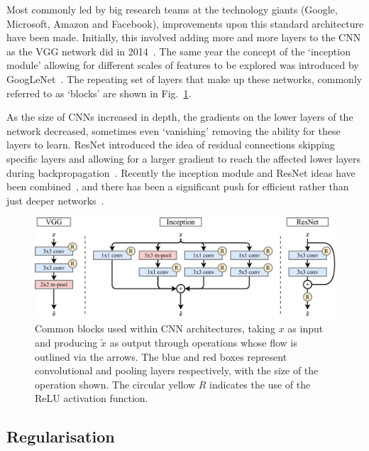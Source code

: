Most commonly led by big research teams at the technology giants (Google, Microsoft, Amazon and
Facebook), improvements upon this standard architecture have been made. Initially, this involved
adding more and more layers to the CNN as the VGG network did in 2014~\cite{simonyan2014}. The
same year the concept of the `inception module' allowing for different scales of features to be
explored was introduced by GoogLeNet~\cite{szegedy2015}. The repeating set of layers that make up
these networks, commonly referred to as `blocks' are shown in Fig.~\ref{fig:blocks}.

As the size of CNNs increased in depth, the gradients on the lower layers of the network
decreased, sometimes even `vanishing' removing the ability for these layers to learn. ResNet
introduced the idea of residual connections skipping specific layers and allowing for a larger
gradient to reach the affected lower layers during backpropagation~\cite{he2016_original,
    he2016_improved}. Recently the inception module and ResNet ideas have been
combined~\cite{szegedy2016}, and there has been a significant push for efficient rather than just
deeper networks~\cite{sandler2018,tan2019}.

\begin{figure} %
    \includegraphics[width=\textwidth]{diagrams/6-cvn/blocks.pdf}
    \caption[Common CNN architecture blocks]
    {Common blocks used within CNN architectures, taking $x$ as input and producing $\tilde{x}$ as
        output through operations whose flow is outlined via the arrows. The blue and red boxes
        represent convolutional and pooling layers respectively, with the size of the operation
        shown. The circular yellow $R$ indicates the use of the ReLU activation function.}
    \label{fig:blocks}
\end{figure}

\subsection{Regularisation} %
\label{sec:cvn_theory_reg} %

